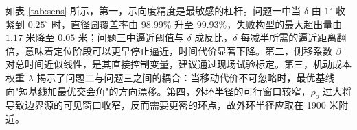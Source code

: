 如表 \ref{tab:sens} 所示，第一，示向度精度是最敏感的杠杆。问题一中当 $\delta$ 由 $1^\circ$ 收紧到 $0.25^\circ$ 时，直径圆覆盖率由 $98.99\%$ 升至 $99.93\%$，失败构型的最大超出量由 $1.17$ 米降至 $0.05$ 米；问题三中逼近阈值与 $\delta$ 成反比，$\delta$ 每减半所需的逼近距离翻倍，意味着定位阶段可以更早停止逼近，时间代价显著下降。第二，侧移系数 $\beta$ 对总时间近似线性，是其直接控制变量，建议通过现场试验标定。第三，机动成本权重 $\lambda$ 揭示了问题二与问题三之间的耦合：当移动代价不可忽略时，最优基线向"短基线加最优交会角"的方向漂移。第四，外环半径的可行窗口较窄，$\rho_o$ 过大将导致边界源的可见窗口收窄，反而需要更密的环点，故外环半径应取在 1900 米附近。
